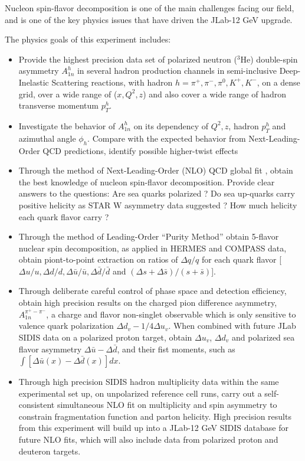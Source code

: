 Nucleon spin-flavor decomposition is one of the main challenges facing our field, and is one of the key physics issues that have driven the JLab-12 GeV upgrade.



The physics goals of this experiment includes:

\begin{itemize}
\item {Provide the highest precision data set of polarized neutron ($^3$He) double-spin asymmetry $A_{1n}^h$ in several hadron production channels in semi-inclusive Deep-Inelastic Scattering reactions, with hadron $h=\pi^+, \pi^-, \pi^0, K^+, K^-$,  on a dense grid, over a wide range of ($x, Q^2, z$) and also cover a wide range of hadron transverse momentum $p_T^h$.}    

\item {Investigate the behavior of  $A_{1n}^h$  on its dependency of $Q^2, z$, hadron $p_T^h$ and azimuthal angle $\phi_h$. Compare with the expected behavior from Next-Leading-Order  QCD predictions, identify possible higher-twist effects }

\item { Through the method of Next-Leading-Order (NLO)  QCD global fit , obtain the best knowledge of nucleon spin-flavor decomposition.  Provide clear answers to the questions: Are sea quarks polarized ? Do sea up-quarks carry positive helicity as STAR W asymmetry data suggested ?  How much helicity  each quark flavor carry ?  }

\item { Through the method of Leading-Order ``Purity Method'' obtain 5-flavor nuclear spin decomposition,  as applied in HERMES and COMPASS data, obtain piont-to-point extraction on ratios of  $\Delta q/q$ for each quark flavor [$\Delta u/u, \Delta d/d, \Delta \bar{u}/\bar{u},  \Delta \bar{d}/\bar{d}$    and $ (\Delta s+\Delta \bar{s})/(s+\bar{s})$]. }  

\item { Through deliberate careful control of phase space and detection efficiency, obtain high precision results on the charged pion difference asymmetry, $A_{1n}^{\pi^+-\pi^-}$, a charge and flavor non-singlet observable which is only sensitive to valence quark polarization $\Delta d_v - 1/4 \Delta u_v$.  When combined with future JLab  SIDIS data on a polarized proton target,  obtain $\Delta u_v$, $\Delta d_v$ and polarized sea flavor asymmetry $\Delta \bar{u}-\Delta \bar{d}$, and their fist moments, such as $\int  [\Delta \bar{u}(x)-\Delta \bar{d}(x)] dx$. } 

\item { Through high precision SIDIS hadron multiplicity data  within the same experimental set up, on  unpolarized reference cell runs,        carry out a self-consistent simultaneous NLO fit on multiplicity and spin asymmetry to  constrain fragmentation function and parton helicity.    High precision results from this experiment will build up into a JLab-12 GeV SIDIS database for future NLO fits, which will also include data from polarized proton and deuteron targets.}
\end{itemize}

